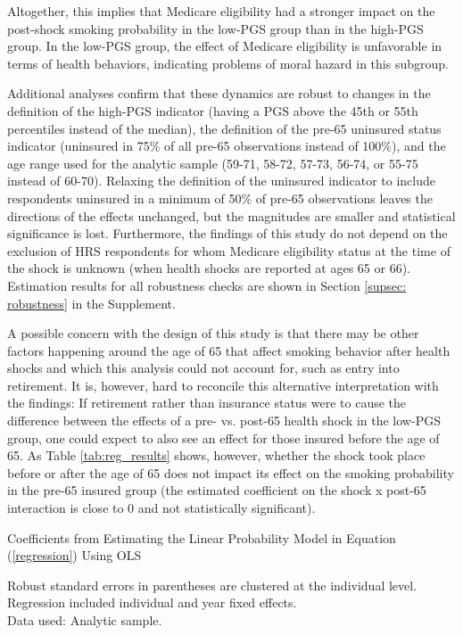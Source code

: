 \documentclass[12pt]{article}
\begin{document}
Altogether, this implies that Medicare eligibility had a stronger impact on the post-shock smoking probability in the low-PGS group than in the high-PGS group. In the low-PGS group, the effect of Medicare eligibility is unfavorable in terms of health behaviors, indicating problems of moral hazard in this subgroup.

Additional analyses confirm that these dynamics are robust to changes in the definition of the high-PGS indicator (having a PGS above the 45th or 55th percentiles instead of the median), the definition of the pre-65 uninsured status indicator (uninsured in 75\% of all pre-65 observations instead of 100\%), and the age range used for the analytic sample (59-71, 58-72, 57-73, 56-74, or 55-75 instead of 60-70). Relaxing the definition of the uninsured indicator to include respondents uninsured in a minimum of 50\% of pre-65 observations leaves the directions of the effects unchanged, but the magnitudes are smaller and statistical significance is lost. Furthermore, the findings of this study do not depend on the exclusion of HRS respondents for whom Medicare eligibility status at the time of the shock is unknown (when health shocks are reported at ages 65 or 66). Estimation results for all robustness checks are shown in Section \ref*{supsec: robustness} in the Supplement.

A possible concern with the design of this study is that there may be other factors happening around the age of 65 that affect smoking behavior after health shocks and which this analysis could not account for, such as entry into retirement. It is, however, hard to reconcile this alternative interpretation with the findings: If retirement rather than insurance status were to cause the difference between the effects of a pre- vs. post-65 health shock in the low-PGS group, one could expect to also see an effect for those insured before the age of 65. As Table \ref{tab:reg_results} shows, however, whether the shock took place before or after the age of 65 does not impact its effect on the smoking probability in the pre-65 insured group (the estimated coefficient on the \textsf{shock x post-65} interaction is close to 0 and not statistically significant).\\ \vspace{-2mm}


\captionsetup{width = 9cm}
\begin{table}[h] \centering
	\caption{Coefficients from Estimating the Linear Probability Model in Equation (\ref{regression}) Using OLS\vspace{-0.4cm}}
	\label{tab:reg_results}
	
	\begin{flushleft}
	 Robust standard errors in parentheses are clustered at the individual level. \\
	Regression included individual and year fixed effects.\\
	Data used: Analytic sample.
	\end{flushleft}
\end{table}
\end{document}
